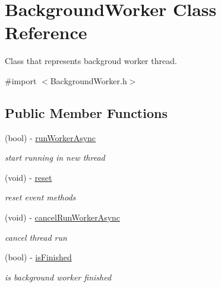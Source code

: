 \hypertarget{interface_background_worker}{
\section{\-Background\-Worker \-Class \-Reference}
\label{interface_background_worker}
}


\-Class that represents backgroud worker thread.  




{\ttfamily \#import $<$\-Background\-Worker.\-h$>$}

\subsection*{\-Public \-Member \-Functions}
\begin{DoxyCompactItemize}
\item 
\hypertarget{interface_background_worker_a38833019945d89e8fb1c8e4b528a5d68}{
(bool) -\/ \hyperlink{interface_background_worker_a38833019945d89e8fb1c8e4b528a5d68}{run\-Worker\-Async}}
\label{interface_background_worker_a38833019945d89e8fb1c8e4b528a5d68}

\begin{DoxyCompactList}\small\item\em start running in new thread \end{DoxyCompactList}\item 
\hypertarget{interface_background_worker_ae9eb3017576faae7d1c504223a2e1fe5}{
(void) -\/ \hyperlink{interface_background_worker_ae9eb3017576faae7d1c504223a2e1fe5}{reset}}
\label{interface_background_worker_ae9eb3017576faae7d1c504223a2e1fe5}

\begin{DoxyCompactList}\small\item\em reset event methods \end{DoxyCompactList}\item 
\hypertarget{interface_background_worker_ab95aeb10bfede1fa3dd01d5b3665dacd}{
(void) -\/ \hyperlink{interface_background_worker_ab95aeb10bfede1fa3dd01d5b3665dacd}{cancel\-Run\-Worker\-Async}}
\label{interface_background_worker_ab95aeb10bfede1fa3dd01d5b3665dacd}

\begin{DoxyCompactList}\small\item\em cancel thread run \end{DoxyCompactList}\item 
\hypertarget{interface_background_worker_a335cf56e270e7ad64242426630891a3f}{
(bool) -\/ \hyperlink{interface_background_worker_a335cf56e270e7ad64242426630891a3f}{is\-Finished}}
\label{interface_background_worker_a335cf56e270e7ad64242426630891a3f}

\begin{DoxyCompactList}\small\item\em is background worker finished \end{DoxyCompactList}\end{DoxyCompactItemize}
